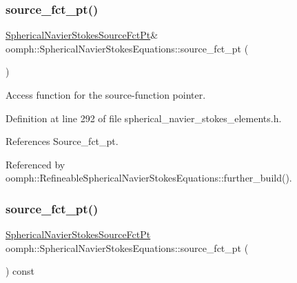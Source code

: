 \subsubsection{\texorpdfstring{source\+\_\+fct\+\_\+pt()}{source\_fct\_pt()}\hspace{0.1cm}{\footnotesize\ttfamily [1/2]}}
{\footnotesize\ttfamily \hyperlink{classoomph_1_1SphericalNavierStokesEquations_abd522fea532c3de15dbe80205e53bdf8}{Spherical\+Navier\+Stokes\+Source\+Fct\+Pt}\& oomph\+::\+Spherical\+Navier\+Stokes\+Equations\+::source\+\_\+fct\+\_\+pt (\begin{DoxyParamCaption}{ }\end{DoxyParamCaption})\hspace{0.3cm}{\ttfamily [inline]}}



Access function for the source-\/function pointer. 



Definition at line 292 of file spherical\+\_\+navier\+\_\+stokes\+\_\+elements.\+h.



References Source\+\_\+fct\+\_\+pt.



Referenced by oomph\+::\+Refineable\+Spherical\+Navier\+Stokes\+Equations\+::further\+\_\+build().

\mbox{\label{classoomph_1_1SphericalNavierStokesEquations_a380e3b8db32dbafbdd0a7a798b234be6}} 
\subsubsection{\texorpdfstring{source\+\_\+fct\+\_\+pt()}{source\_fct\_pt()}\hspace{0.1cm}{\footnotesize\ttfamily [2/2]}}
{\footnotesize\ttfamily \hyperlink{classoomph_1_1SphericalNavierStokesEquations_abd522fea532c3de15dbe80205e53bdf8}{Spherical\+Navier\+Stokes\+Source\+Fct\+Pt} oomph\+::\+Spherical\+Navier\+Stokes\+Equations\+::source\+\_\+fct\+\_\+pt (\begin{DoxyParamCaption}{ }\end{DoxyParamCaption}) const\hspace{0.3cm}{\ttfamily [inline]}}



